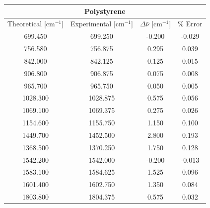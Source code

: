 \documentclass{article}
\begin{document}
\begin{appendices}
\begin{table}[h!]
	\centering
	\begin{tabular}{|cccc|}
	\hline
	\multicolumn{4}{|c|}{Polystyrene}                                                                     \\ \hline
	\multicolumn{1}{|c|}{Theoretical {[}cm$^{-1}${]}} &
	  \multicolumn{1}{c|}{Experimental {[}cm$^{-1}${]}} &
	  \multicolumn{1}{c|}{$\Delta \bar{\nu}$ {[}cm$^{-1}${]}} &
	  $\%$ Error \\ \hline
	\multicolumn{1}{|c|}{699.450}  & \multicolumn{1}{c|}{699.250}  & \multicolumn{1}{c|}{-0.200} & -0.029 \\ \hline
	\multicolumn{1}{|c|}{756.580}  & \multicolumn{1}{c|}{756.875}  & \multicolumn{1}{c|}{0.295}  & 0.039  \\ \hline
	\multicolumn{1}{|c|}{842.000}  & \multicolumn{1}{c|}{842.125}  & \multicolumn{1}{c|}{0.125}  & 0.015  \\ \hline
	\multicolumn{1}{|c|}{906.800}  & \multicolumn{1}{c|}{906.875}  & \multicolumn{1}{c|}{0.075}  & 0.008  \\ \hline
	\multicolumn{1}{|c|}{965.700}  & \multicolumn{1}{c|}{965.750}  & \multicolumn{1}{c|}{0.050}  & 0.005  \\ \hline
	\multicolumn{1}{|c|}{1028.300} & \multicolumn{1}{c|}{1028.875} & \multicolumn{1}{c|}{0.575}  & 0.056  \\ \hline
	\multicolumn{1}{|c|}{1069.100} & \multicolumn{1}{c|}{1069.375} & \multicolumn{1}{c|}{0.275}  & 0.026  \\ \hline
	\multicolumn{1}{|c|}{1154.600} & \multicolumn{1}{c|}{1155.750} & \multicolumn{1}{c|}{1.150}  & 0.100  \\ \hline
	\multicolumn{1}{|c|}{1449.700} & \multicolumn{1}{c|}{1452.500} & \multicolumn{1}{c|}{2.800}  & 0.193  \\ \hline
	\multicolumn{1}{|c|}{1368.500} & \multicolumn{1}{c|}{1370.250} & \multicolumn{1}{c|}{1.750}  & 0.128  \\ \hline
	\multicolumn{1}{|c|}{1542.200} & \multicolumn{1}{c|}{1542.000} & \multicolumn{1}{c|}{-0.200} & -0.013 \\ \hline
	\multicolumn{1}{|c|}{1583.100} & \multicolumn{1}{c|}{1584.625} & \multicolumn{1}{c|}{1.525}  & 0.096  \\ \hline
	\multicolumn{1}{|c|}{1601.400} & \multicolumn{1}{c|}{1602.750} & \multicolumn{1}{c|}{1.350}  & 0.084  \\ \hline
	\multicolumn{1}{|c|}{1803.800} & \multicolumn{1}{c|}{1804.375} & \multicolumn{1}{c|}{0.575}  & 0.032  \\ \hline

\end{tabular}
\end{table}
\end{appendices}
\end{document}
